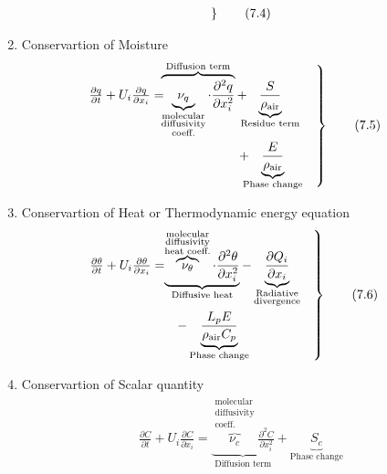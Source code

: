 \documentclass[fleqn,10pt]{SelfArx} %
\begin{document}
\begin{enumerate}[noitemsep]
\begin{align*}
\begin{rcases}
		      \end{rcases} \tag{7.4} \label{eq:momentumeq}
	      \end{align*}
	\item Conservartion of Moisture
	      \begin{align*}
		      \begin{rcases}
			    \mspace{-20mu} \frac{\partial q}{\partial t} + U_i\frac{\partial q}{\partial x_i} = \!\!\! \overbrace{\underbrace{\nu_q}_{\substack{\text{molecular} \\ \text{diffusivity} \\ \text{coeff.}}} \cdot \frac{\partial^2 q}{\partial x_i^2}}^{\text{Diffusion term}} & \!\!\!\!\! + \!\!\!\! \underbrace{\frac{S}{\rho_{\text{air}}}}_{\text{Residue term}} \\ & \!\!\!\! + \!\!\!\! \underbrace{\frac{E}{\rho_{\text{air}}}}_{\text{Phase change}} \quad
		      \end{rcases} \tag{7.5} \label{eq:moistureeq}
	      \end{align*}
	\item Conservartion of Heat or Thermodynamic energy equation
	      \begin{align*}
		      \begin{rcases}
			    \mspace{-20mu} \frac{\partial \theta}{\partial t} + U_i\frac{\partial \theta}{\partial x_i} = & \!\!\!\!\!\!\underbrace{\overbrace{\nu_\theta}^{\substack{\text{molecular} \\ \text{diffusivity} \\ \text{heat coeff.}}} \cdot \frac{\partial^2 \theta}{\partial x_i^2}}_{\text{Diffusive heat}} - \underbrace{\frac{\partial Q_i}{\partial x_i}}_{\substack{\text{Radiative} \\ \text{divergence}}} \quad \\ & - \underbrace{\frac{L_pE}{\rho_{\text{air}}C_p}}_{\text{Phase change}}
		      \end{rcases} \tag{7.6} \label{eq:heateq}
	      \end{align*}
	\item Conservartion of Scalar quantity
	      \begin{align*}
		      \frac{\partial C}{\partial t} + U_i\frac{\partial C}{\partial x_i} = \underbrace{\overbrace{\nu_c}^{\substack{\text{molecular} \\ \text{diffusivity} \\ \text{coeff.}}} \frac{\partial^2 C}{\partial x_i^2}}_{\text{Diffusion term}} + \!\!\!\! \underbrace{S_c}_{\text{Phase change}} \tag{7.7} \label{eq:scalarquantity}
	      \end{align*}
\end{enumerate}
\end{document}
